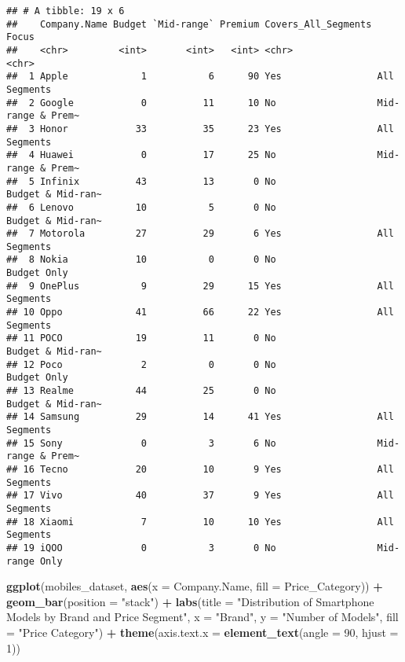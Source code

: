 \documentclass[
]{article}
\newenvironment{Shaded}{\begin{snugshade}}{\end{snugshade}}
\newcommand{\AttributeTok}[1]{\textcolor[rgb]{0.13,0.29,0.53}{#1}}
\newcommand{\DecValTok}[1]{\textcolor[rgb]{0.00,0.00,0.81}{#1}}
\newcommand{\FunctionTok}[1]{\textcolor[rgb]{0.13,0.29,0.53}{\textbf{#1}}}
\newcommand{\NormalTok}[1]{#1}
\newcommand{\SpecialCharTok}[1]{\textcolor[rgb]{0.81,0.36,0.00}{\textbf{#1}}}
\newcommand{\StringTok}[1]{\textcolor[rgb]{0.31,0.60,0.02}{#1}}
\begin{document}
\begin{verbatim}
## # A tibble: 19 x 6
##    Company.Name Budget `Mid-range` Premium Covers_All_Segments Focus            
##    <chr>         <int>       <int>   <int> <chr>               <chr>            
##  1 Apple             1           6      90 Yes                 All Segments     
##  2 Google            0          11      10 No                  Mid-range & Prem~
##  3 Honor            33          35      23 Yes                 All Segments     
##  4 Huawei            0          17      25 No                  Mid-range & Prem~
##  5 Infinix          43          13       0 No                  Budget & Mid-ran~
##  6 Lenovo           10           5       0 No                  Budget & Mid-ran~
##  7 Motorola         27          29       6 Yes                 All Segments     
##  8 Nokia            10           0       0 No                  Budget Only      
##  9 OnePlus           9          29      15 Yes                 All Segments     
## 10 Oppo             41          66      22 Yes                 All Segments     
## 11 POCO             19          11       0 No                  Budget & Mid-ran~
## 12 Poco              2           0       0 No                  Budget Only      
## 13 Realme           44          25       0 No                  Budget & Mid-ran~
## 14 Samsung          29          14      41 Yes                 All Segments     
## 15 Sony              0           3       6 No                  Mid-range & Prem~
## 16 Tecno            20          10       9 Yes                 All Segments     
## 17 Vivo             40          37       9 Yes                 All Segments     
## 18 Xiaomi            7          10      10 Yes                 All Segments     
## 19 iQOO              0           3       0 No                  Mid-range Only
\end{verbatim}

\begin{Shaded}
\begin{Highlighting}[]
\FunctionTok{ggplot}\NormalTok{(mobiles\_dataset, }\FunctionTok{aes}\NormalTok{(}\AttributeTok{x =}\NormalTok{ Company.Name, }\AttributeTok{fill =}\NormalTok{ Price\_Category)) }\SpecialCharTok{+}
  \FunctionTok{geom\_bar}\NormalTok{(}\AttributeTok{position =} \StringTok{"stack"}\NormalTok{) }\SpecialCharTok{+}
  \FunctionTok{labs}\NormalTok{(}\AttributeTok{title =} \StringTok{"Distribution of Smartphone Models by Brand and Price Segment"}\NormalTok{,}
       \AttributeTok{x =} \StringTok{"Brand"}\NormalTok{, }\AttributeTok{y =} \StringTok{"Number of Models"}\NormalTok{,}
       \AttributeTok{fill =} \StringTok{"Price Category"}\NormalTok{) }\SpecialCharTok{+}
  \FunctionTok{theme}\NormalTok{(}\AttributeTok{axis.text.x =} \FunctionTok{element\_text}\NormalTok{(}\AttributeTok{angle =} \DecValTok{90}\NormalTok{, }\AttributeTok{hjust =} \DecValTok{1}\NormalTok{))}
\end{Highlighting}
\end{Shaded}
\end{document}
